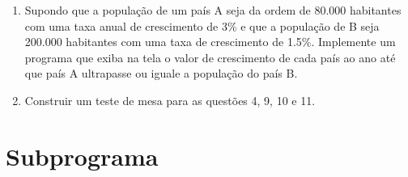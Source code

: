 \documentclass[11pt]{article}
\begin{document}
\begin{enumerate}
	\item Supondo que a população de um país A seja da ordem de 80.000 habitantes com uma taxa
	anual de crescimento de 3\% e que a população de B seja 200.000 habitantes com uma taxa de
	crescimento de 1.5\%. Implemente um programa que exiba na tela o valor de crescimento de cada
	país ao ano até que país A ultrapasse ou iguale a população do país B.
	
	\item Construir um teste de mesa para as questões 4, 9, 10 e 11.
\end{enumerate}

\newpage

\section{Subprograma}
\end{document}
